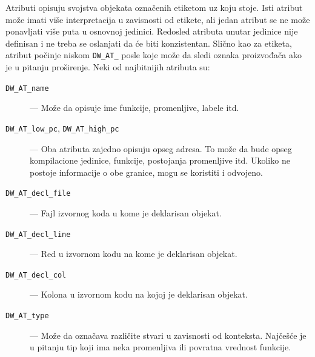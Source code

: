 \documentclass[12pt,oneside]{memoir}
\begin{document}
Atributi opisuju svojstva objekata označenih etiketom uz koju stoje.
Isti atribut može imati više interpretacija u zavisnosti od etikete, ali jedan atribut se ne može ponavljati više puta u osnovnoj jedinici.
Redosled atributa unutar jedinice nije definisan i ne treba se oslanjati da će biti konzistentan.
Slično kao za etiketa, atribut počinje niskom \verb|DW_AT_| posle koje može da sledi oznaka proizvođača ako je u pitanju proširenje.
Neki od najbitnijih atributa su:
\begin{description}
  \item[\texttt{DW\_AT\_name}] --- Može da opisuje ime funkcije, promenljive, labele itd.
  \item[\texttt{DW\_AT\_low\_pc}, \texttt{DW\_AT\_high\_pc}] --- Oba atributa zajedno opisuju opseg adresa. To može da bude opseg kompilacione jedinice, funkcije, postojanja promenljive itd. Ukoliko ne postoje informacije o obe granice, mogu se koristiti i odvojeno.
  \item[\texttt{DW\_AT\_decl\_file}] --- Fajl izvornog koda u kome je deklarisan objekat.
  \item[\texttt{DW\_AT\_decl\_line}] --- Red u izvornom kodu na kome je deklarisan objekat.
  \item[\texttt{DW\_AT\_decl\_col}] --- Kolona u izvornom kodu na kojoj je deklarisan objekat.
  \item[\texttt{DW\_AT\_type}] --- Može da označava različite stvari u zavisnosti od konteksta. Najčešće je u pitanju tip koji ima neka promenljiva ili povratna vrednost funkcije. 
\end{description}

\end{document}
